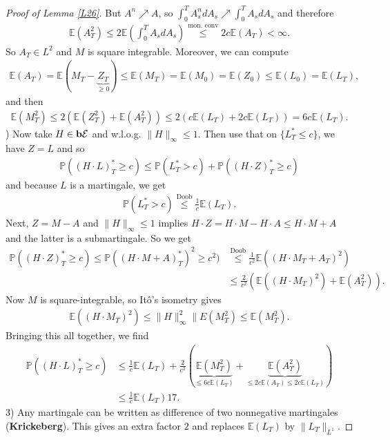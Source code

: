 \documentclass[12pt,a4paper, twoside]{article}
\theoremstyle{definition}
\newcommand{\EE}{\mathbb{E}} %
\newcommand{\PP}{\mathbb{P}} %
\newcommand{\simple}{\textbf{\text{b}}\mathcal{E}}
\begin{document}
\begin{proof}[Proof of Lemma \ref{L26}]
But $A^n \nearrow A$, so $\int_0^T A_s^n dA_s \nearrow \int_0^T A_s dA_s$ and therefore 
\begin{align*}
\EE(A_T^2) \leq 2 \EE \left( \int_0^T A_s d A_s \right) \overset{\text{mon. conv}}\leq 2c \EE(A_T) < \infty.
\end{align*}
So $A_T \in L^2$ and $M$ is square integrable. Moreover, we can compute 
\begin{align*}
\EE(A_T)= \EE(M_T-\underbrace{Z_T}_{ \geq 0}) \leq \EE(M_T)=\EE(M_0) = \EE(Z_0) \leq \EE(L_0)= \EE(L_T),
\end{align*}
and then 
\begin{align*}
\EE(M_T^2) \leq 2( \EE(Z_T^2) + \EE(A_T^2)) \leq 2(c \EE(L_T)+2c \EE(L_T)) = 6c \EE(L_T).
\end{align*}
\newpage
{}) Now take $H \in \simple$ and w.l.o.g. $\|H\|_\infty \leq 1$. Then use that on $\{ L_T^* \leq c\}$, we have $Z=L$ and so 
\begin{align*}
\PP((H \cdot L)_T^* \geq c) \leq \PP(L_T^* > c) + \PP( ( H \cdot Z)_T^* \geq c)
\end{align*}
and because $L$ is a martingale, we get 
\begin{align*}
\PP(L_T^* >c) \overset{\text{Doob}}\leq \frac{1}{c} \EE(L_T).
\end{align*}
Next, $Z=M-A$ and $\|H\|_\infty \leq 1$ implies $H \cdot Z = H \cdot M - H \cdot A \leq H \cdot M + A$ and the latter is a submartingale. So we get
\begin{align*}
\PP((H \cdot Z)_T^* \geq c) \leq \PP((H \cdot M + A)_T^*)^2  \geq c^2 ) &\overset{\text{Doob}}\leq \frac{1}{c^2} \EE((H \cdot M_T + A_T)^2)  \\
&\leq \frac{2}{c^2} ( \EE((H \cdot M_T)^2 ) + \EE(A_T^2)). 
\end{align*}
Now $M$ is square-integrable, so Itô's isometry gives 
\begin{align*}
\EE(( H \cdot M_T)^2 ) \leq \|H\|_\infty^2 \|E(M_T^2) \leq \EE (M_T^2). 
\end{align*}
Bringing this all together, we find
\begin{align*}
\PP((H \cdot L)_T^* \geq c)& \leq \frac{1}{c} \EE(L_T) + \frac{2}{c^2}( \underbrace{\EE(M_T^2)}_{ \leq 6c \EE(L_T)} + \underbrace{\EE(A_T^2)}_{\leq 2c \EE(A_T) \leq 2c \EE(L_T)}) \\
& \leq \frac{1}{c} \EE(L_T)17.
\end{align*}
3) Any martingale can be written as difference of two nonnegative martingales (\textbf{Krickeberg}). This gives an extra factor $2$ and replaces $\EE(L_T)$ by $\|L_T\|_{L^1}$. 
\end{proof}
\newpage
\end{document}
